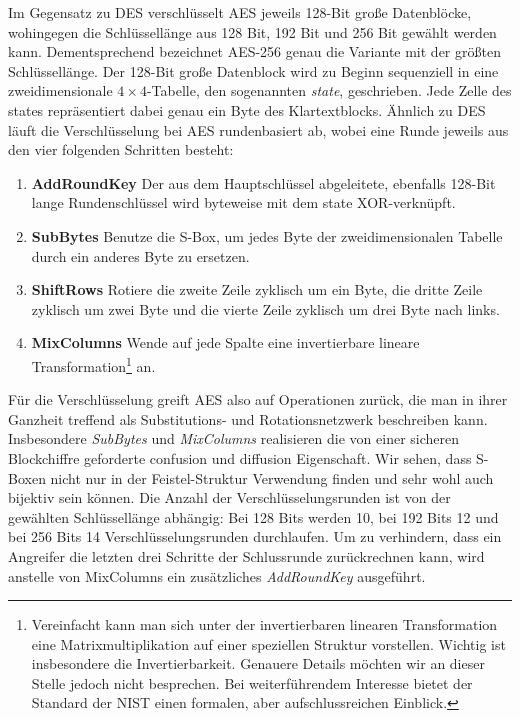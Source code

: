 Im Gegensatz zu DES verschlüsselt AES jeweils 128-Bit große Datenblöcke, wohingegen die Schlüssellänge aus 128 Bit, 192 Bit und 256 Bit gewählt werden kann. Dementsprechend bezeichnet AES-256 genau die Variante mit der größten Schlüssellänge. Der 128-Bit große Datenblock wird zu Beginn sequenziell in eine zweidimensionale $4 \times 4$-Tabelle, den sogenannten \emph{state}, geschrieben. Jede Zelle des states repräsentiert dabei genau ein Byte des Klartextblocks. Ähnlich zu DES läuft die Verschlüsselung bei AES rundenbasiert ab, wobei eine Runde jeweils aus den vier folgenden Schritten besteht:

\begin{enumerate}
	\small
	\item \textbf{AddRoundKey} Der aus dem Hauptschlüssel abgeleitete, ebenfalls 128-Bit lange Rundenschlüssel wird byteweise mit dem state XOR-verknüpft.
	\item \textbf{SubBytes} Benutze die S-Box, um jedes Byte der zweidimensionalen Tabelle durch ein anderes Byte zu ersetzen.
	\item \textbf{ShiftRows} Rotiere die zweite Zeile zyklisch um ein Byte, die dritte Zeile zyklisch um zwei Byte und die vierte Zeile zyklisch um drei Byte nach links.
	\item \textbf{MixColumns} Wende auf jede Spalte eine invertierbare lineare Transformation\footnote{Vereinfacht kann man sich unter der invertierbaren linearen Transformation eine Matrixmultiplikation auf einer speziellen Struktur vorstellen. Wichtig ist insbesondere die Invertierbarkeit. Genauere Details möchten wir an dieser Stelle jedoch nicht besprechen. Bei weiterführendem Interesse bietet der Standard der NIST \cite{NIST_AES01} einen formalen, aber aufschlussreichen Einblick.} an.
\end{enumerate}

Für die Verschlüsselung greift AES also auf Operationen zurück, die man in ihrer Ganzheit treffend als Substitutions- und Rotationsnetzwerk beschreiben kann. Insbesondere \textit{SubBytes} und \textit{MixColumns} realisieren die von einer sicheren Blockchiffre geforderte confusion und diffusion Eigenschaft. Wir sehen, dass S-Boxen \indexSBOX nicht nur in der Feistel-Struktur Verwendung finden und sehr wohl auch bijektiv sein können.
Die Anzahl der Verschlüsselungsrunden ist von der gewählten Schlüssellänge abhängig: Bei 128 Bits werden 10, bei 192 Bits 12 und bei 256 Bits 14 Verschlüsselungsrunden durchlaufen. Um zu verhindern, dass ein Angreifer die letzten drei Schritte der Schlussrunde zurückrechnen kann, wird anstelle von MixColumns ein zusätzliches \textit{AddRoundKey} ausgeführt.

